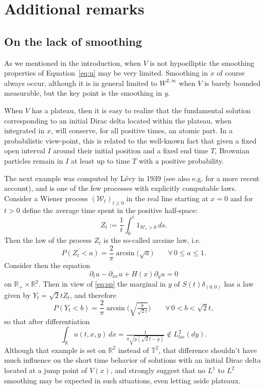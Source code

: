 \documentclass[12pt]{article}
\newcommand{\R}{\mathbb{R}}
\newcommand{\T}{\mathbb{T}}
\begin{document}
\section{Additional remarks}\label{sec:fourretout}

\subsection{On the lack of smoothing}
As we mentioned in the introduction, when $V$ is not hypoelliptic the smoothing
properties of Equation~\eqref{eq:u} may be very limited. Smoothing in $x$ of
course always occur, although it is in general limited to $W^{2,\infty}$ when
$V$ is barely bounded measurable, but the key point is the smoothing in $y$. 

When $V$ has a plateau, then it is easy to realize that the fundamental solution 
corresponding to an initial Dirac delta located within the plateau, when
integrated in $x$, will conserve, for all positive times, an atomic part. In a
probabilistic view-point, this is related to the well-known fact that given a  
fixed open interval $I$ around their initial position and a fixed end time $T$,  
Brownian particles remain in $I$ at least up to time $T$ with a positive
probability. 

The next example was computed by L\'evy \cite{Levy39} in 1939 (see also e.g.
\cite{Ber21} for a more recent account), and is one of the
few processes with explicitly computable laws.  Consider a Wiener process 
$(\mathcal{W}_t)_{t\geq 0}$ in the real line starting at $x = 0$ and for $t > 0$ 
define the average time spent in the positive half-space:
$$
Z_t := \frac{1}{t}\int_0^t 1_{\mathcal{W}_s > 0}\, ds.
$$
Then the law of the process $Z_t$ is the so-called arcsine law, i.e. 
\begin{equation}\label{eq:arcsine}
	P(Z_t < a) = \frac{2}{\pi} \arcsin\big(\sqrt{a}\big)\qquad \forall\, 0 \leq a \leq
	1.
\end{equation}
Consider then the equation
$$
\partial_t u - \partial_{xx} u + H(x)\partial_y u = 0
$$
on $\R_+ \times \R^2.$ Then in view of \eqref{eq:sp} the marginal in $y$ of
$S(t)\delta_{(0,0)}$ has a law given by $Y_t = \sqrt{2} t Z_t$, and therefore
$$
P(Y_t < b) = \frac{2}{\pi}\arcsin\big(\sqrt{\tfrac{b}{\sqrt{2}t}}\big) \qquad \forall\, 0 < b < \sqrt{2}t,
$$
so that after differentiation
$$
\int_\R u(t,x,y)\, dx = \tfrac{1}{\pi
\sqrt{y(\sqrt{2}t-y)}} \notin L^2_{loc}(dy).
$$
Although that example is set on $\R^2$ instead of $\T^2$, that difference 
shouldn't have much influence on the short time behavior of solutions with 
an initial Dirac delta located at a jump point of $V(x)$, and strongly suggest
that no $L^1$ to $L^2$ smoothing may be expected in such situations, even
letting aside plateaux. 
\end{document}
